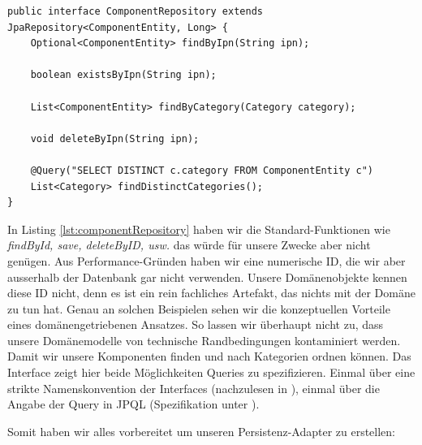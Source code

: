 \begin{listing}[H]
\begin{verbatim}
public interface ComponentRepository extends JpaRepository<ComponentEntity, Long> {
    Optional<ComponentEntity> findByIpn(String ipn);

    boolean existsByIpn(String ipn);

    List<ComponentEntity> findByCategory(Category category);

    void deleteByIpn(String ipn);

    @Query("SELECT DISTINCT c.category FROM ComponentEntity c")
    List<Category> findDistinctCategories();
}
\end{verbatim}
\caption{Component Repository}
\label{lst:componentRepository}
\end{listing}

In Listing \ref{lst:componentRepository} haben wir die Standard-Funktionen
wie \textit{findById, save, deleteByID, usw.} das würde für unsere Zwecke
aber nicht genügen. Aus Performance-Gründen haben wir eine numerische ID,
die wir aber ausserhalb der Datenbank gar nicht verwenden. Unsere
Domänenobjekte kennen diese ID nicht, denn es ist ein rein fachliches
Artefakt, das nichts mit der Domäne zu tun hat. Genau an solchen Beispielen
sehen wir die konzeptuellen Vorteile eines domänengetriebenen Ansatzes.
So lassen wir überhaupt nicht zu, dass unsere Domänemodelle von
technische Randbedingungen kontaminiert werden. Damit wir unsere Komponenten
finden und nach Kategorien ordnen können. Das Interface zeigt hier beide 
Möglichkeiten Queries zu spezifizieren. Einmal über eine strikte
Namenskonvention der Interfaces (nachzulesen in \cite{spring_2026_repo}), 
einmal über die Angabe der Query in JPQL (Spezifikation unter 
\cite{oracle_2026}).

Somit haben wir alles vorbereitet um unseren Persistenz-Adapter zu erstellen:

